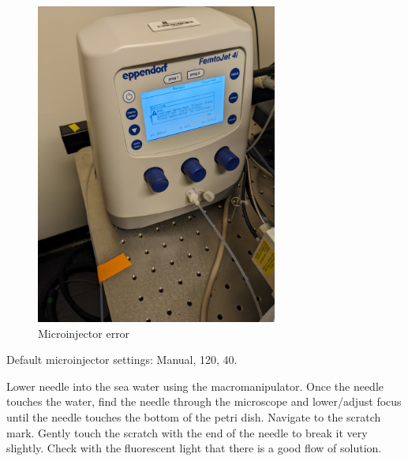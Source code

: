\documentclass[
  letterpaper,
  DIV=11,
  numbers=noendperiod]{scrartcl}
\begin{document}
\begin{figure}

{\centering \includegraphics[width=3.125in,height=\textheight]{micro_photos/included/microinjector_error.jpg}

}

\caption{Microinjector error}

\end{figure}

Default microinjector settings: Manual, 120, 40.

Lower needle into the sea water using the macromanipulator. Once the
needle touches the water, find the needle through the microscope and
lower/adjust focus until the needle touches the bottom of the petri
dish. Navigate to the scratch mark. Gently touch the scratch with the
end of the needle to break it very slightly. Check with the fluorescent
light that there is a good flow of solution.
\end{document}
